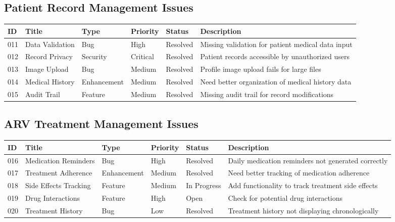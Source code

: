 \documentclass[12pt,a4paper]{article}
\begin{document}
\subsection{Patient Record Management Issues}

\begin{longtable}{|p{0.8cm}|p{2.5cm}|p{1.5cm}|p{1.5cm}|p{1.5cm}|p{4.2cm}|}
\hline
\textbf{ID} & \textbf{Title} & \textbf{Type} & \textbf{Priority} & \textbf{Status} & \textbf{Description} \\
\hline
011 & Data Validation & Bug & High & Resolved & Missing validation for patient medical data input \\
\hline
012 & Record Privacy & Security & Critical & Resolved & Patient records accessible by unauthorized users \\
\hline
013 & Image Upload & Bug & Medium & Resolved & Profile image upload fails for large files \\
\hline
014 & Medical History & Enhancement & Medium & Resolved & Need better organization of medical history data \\
\hline
015 & Audit Trail & Feature & Medium & Resolved & Missing audit trail for record modifications \\
\hline
\end{longtable}

\subsection{ARV Treatment Management Issues}

\begin{longtable}{|p{0.8cm}|p{2.5cm}|p{1.5cm}|p{1.5cm}|p{1.5cm}|p{4.2cm}|}
\hline
\textbf{ID} & \textbf{Title} & \textbf{Type} & \textbf{Priority} & \textbf{Status} & \textbf{Description} \\
\hline
016 & Medication Reminders & Bug & High & Resolved & Daily medication reminders not generated correctly \\
\hline
017 & Treatment Adherence & Enhancement & Medium & Resolved & Need better tracking of medication adherence \\
\hline
018 & Side Effects Tracking & Feature & Medium & In Progress & Add functionality to track treatment side effects \\
\hline
019 & Drug Interactions & Feature & High & Open & Check for potential drug interactions \\
\hline
020 & Treatment History & Bug & Low & Resolved & Treatment history not displaying chronologically \\
\hline
\end{longtable}
\end{document}

